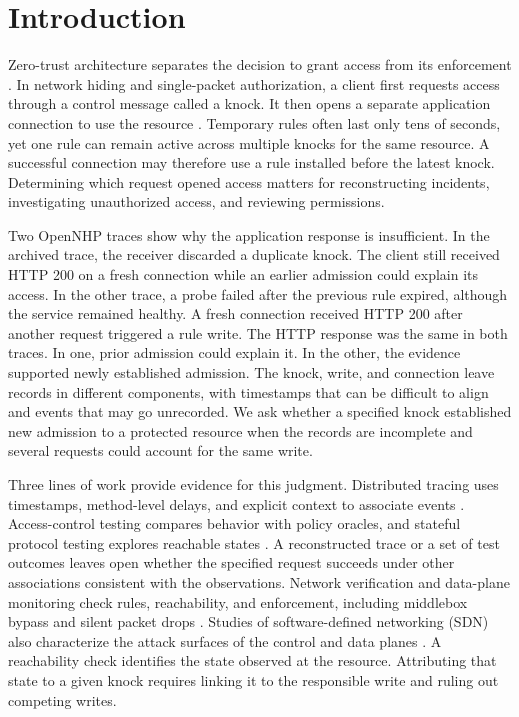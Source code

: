 \section{Introduction}\label{introduction}

Zero-trust architecture separates the decision to grant access from its enforcement \citep{r2}. In network hiding and single-packet authorization, a client first requests access through a control message called a knock. It then opens a separate application connection to use the resource \citep{r1,r13}. Temporary rules often last only tens of seconds, yet one rule can remain active across multiple knocks for the same resource. A successful connection may therefore use a rule installed before the latest knock. Determining which request opened access matters for reconstructing incidents, investigating unauthorized access, and reviewing permissions.

Two OpenNHP traces show why the application response is insufficient. In the archived trace, the receiver discarded a duplicate knock. The client still received HTTP 200 on a fresh connection while an earlier admission could explain its access. In the other trace, a probe failed after the previous rule expired, although the service remained healthy. A fresh connection received HTTP 200 after another request triggered a rule write. The HTTP response was the same in both traces. In one, prior admission could explain it. In the other, the evidence supported newly established admission. The knock, write, and connection leave records in different components, with timestamps that can be difficult to align and events that may go unrecorded. We ask whether a specified knock established new admission to a protected resource when the records are incomplete and several requests could account for the same write.

Three lines of work provide evidence for this judgment. Distributed tracing uses timestamps, method-level delays, and explicit context to associate events \citep{r3,r4}. Access-control testing compares behavior with policy oracles, and stateful protocol testing explores reachable states \citep{r5,r6,r7,r8}. A reconstructed trace or a set of test outcomes leaves open whether the specified request succeeds under other associations consistent with the observations. Network verification and data-plane monitoring check rules, reachability, and enforcement, including middlebox bypass and silent packet drops \citep{r9,r10,r11}. Studies of software-defined networking (SDN) also characterize the attack surfaces of the control and data planes \citep{r12}. A reachability check identifies the state observed at the resource. Attributing that state to a given knock requires linking it to the responsible write and ruling out competing writes.

